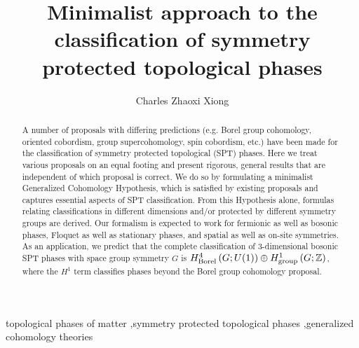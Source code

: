 \documentclass[sort&compress]{elsarticle}
\theoremstyle{theoremstyle}
\theoremstyle{framedtheoremstyle}
\theoremstyle{definitionstyle}
\theoremstyle{definitionstyle}
\theoremstyle{definitionstyle}
\theoremstyle{definitionstyle}
\theoremstyle{nameddefinitionstyle}
\theoremstyle{framednameddefinitionstyle}
\theoremstyle{proofstyle}
\theoremstyle{definitionstyle}
\newcommand{\ZZZ}{\mathbb{Z}}
\newcommand{\paren}[1]{\left( #1 \right)}
\begin{document}
\title{Minimalist approach to the classification of symmetry protected topological phases}
\author{Charles Zhaoxi Xiong}


\address{Department of Physics, Harvard University, Cambridge, MA 02138, USA}
\address{Department of Physics, University of California, Berkeley, CA 94720, USA}




\begin{abstract}
A number of proposals with differing predictions (e.g. Borel group cohomology, oriented cobordism, group supercohomology, spin cobordism, etc.) have been made for the classification of symmetry protected topological (SPT) phases. Here we treat various proposals on an equal footing and present rigorous, general results that are independent of which proposal is correct. We do so by formulating a minimalist Generalized Cohomology Hypothesis, which is satisfied by existing proposals and captures essential aspects of SPT classification. From this Hypothesis alone, formulas relating classifications in different dimensions and/or protected by different symmetry groups are derived. Our formalism is expected to work for fermionic as well as bosonic phases, Floquet as well as stationary phases, and spatial as well as on-site symmetries. As an application, we predict that the complete classification of 3-dimensional bosonic SPT phases with space group symmetry $G$ is $H^4_{\rm Borel}\paren{G;U(1)} \oplus H^1_{\rm group}\paren{G;\ZZZ}$, where the $H^1$ term classifies phases beyond the Borel group cohomology proposal.
\end{abstract}

\begin{keyword}
topological phases of matter \sep symmetry protected topological phases \sep generalized cohomology theories
\end{keyword}

\maketitle



\setcounter{tocdepth}{2}

\tableofcontents
\end{document}
